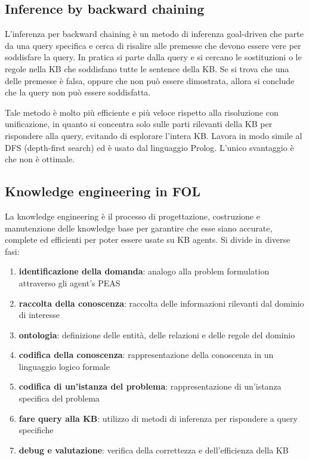 \subsection*{Inference by backward chaining}
L'inferenza per backward chaining è un metodo di inferenza goal-driven che parte da una query specifica e cerca di risalire
alle premesse che devono essere vere per soddisfare la query. In pratica si parte dalla query e si cercano le sostituzioni
o le regole nella KB che soddisfano tutte le sentence della KB. Se si trova che una delle premesse è falsa, oppure che non
può essere dimostrata, allora si conclude che la query non può essere soddisfatta.

Tale metodo è molto più efficiente e più veloce rispetto alla risoluzione con unificazione, in quanto si concentra solo
sulle parti rilevanti della KB per rispondere alla query, evitando di esplorare l'intera KB. Lavora in modo simile al DFS
(depth-first search) ed è usato dal linguaggio Prolog. L'unico svantaggio è che non è ottimale.

\subsection{Knowledge engineering in FOL}
La knowledge engineering è il processo di progettazione, costruzione e manutenzione delle knowledge base per garantire che
esse siano accurate, complete ed efficienti per poter essere usate su KB agents. Si divide in diverse fasi:
\begin{enumerate}
	\item \textbf{identificazione della domanda}: analogo alla problem formulation attraverso gli agent's PEAS
	\item \textbf{raccolta della conoscenza}: raccolta delle informazioni rilevanti dal dominio di interesse
	\item \textbf{ontologia}: definizione delle entità, delle relazioni e delle regole del dominio
	\item \textbf{codifica della conoscenza}: rappresentazione della conoscenza in un linguaggio logico formale
	\item \textbf{codifica di un'istanza del problema}: rappresentazione di un'istanza specifica del problema
	\item \textbf{fare query alla KB}: utilizzo di metodi di inferenza per rispondere a query specifiche  
	\item \textbf{debug e valutazione}: verifica della correttezza e dell'efficienza della KB
\end{enumerate}
